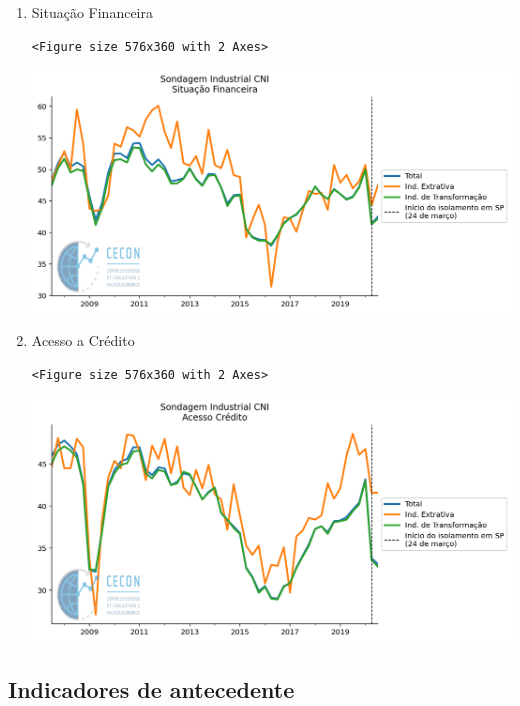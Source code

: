 \documentclass[11pt]{article}
\begin{document}
\begin{enumerate}
\item Situação Financeira
\label{sec:org3c36a53}

\begin{verbatim}
<Figure size 576x360 with 2 Axes>
\end{verbatim}


\begin{center}
\includegraphics[width=.9\linewidth]{obipy-resources/62e383af79e91b63c7fc98dd7fb55b3c3ececcb9/bf403eed7affd3cdac032cea98157acdb3c29b05.png}
\end{center}


\item Acesso a Crédito
\label{sec:org78070ab}

\begin{verbatim}
<Figure size 576x360 with 2 Axes>
\end{verbatim}


\begin{center}
\includegraphics[width=.9\linewidth]{obipy-resources/62e383af79e91b63c7fc98dd7fb55b3c3ececcb9/d8b87eca93910a125a0efab8c3c2d1ff4bc1d07b.png}
\end{center}
\end{enumerate}

\subsection{Indicadores de antecedente}
\label{sec:org6d20eb3}
\end{document}
